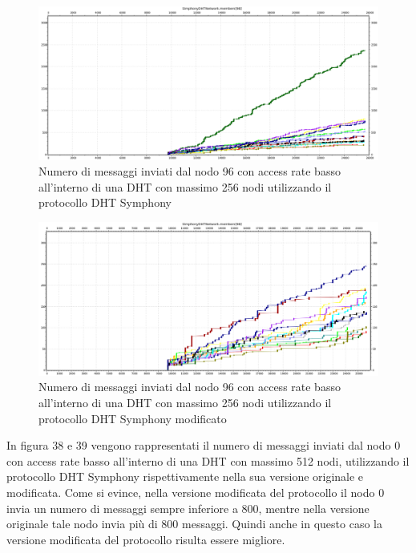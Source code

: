 \documentclass[	
	DIV=calc,
	paper=a4,
	fontsize=11pt,
	onecolumn
]{scrartcl} %
\begin{document}
	\begin{figure}[H]
		\centering
		\includegraphics[scale=0.35]	{SymphonyDHT/plots/MessagesSentByEveryNode/256_Nodes_SlowAccess/SymphonyDHT_256Nodes_SlowAccess_Node96.png}
		\caption{Numero di messaggi inviati dal nodo 96 con access rate basso all'interno di una DHT con massimo 256 nodi utilizzando il protocollo DHT Symphony}
		\label{Figura 36}
	\end{figure}
	\begin{figure}[H]
		\centering
		\includegraphics[scale=0.35]	{SymphonyDHTMod/plots/MessagesSentByEveryNode/256_Nodes_SlowAccess/SymphonyDHTMod_256Nodes_SlowAccess_Node96.png}
		\caption{Numero di messaggi inviati dal nodo 96 con access rate basso all'interno di una DHT con massimo 256 nodi utilizzando il protocollo DHT Symphony modificato}
		\label{Figura 37}
	\end{figure}		
	
	In figura 38 e 39 vengono rappresentati il numero di messaggi inviati dal nodo 0 con access rate basso all'interno di una DHT con massimo 512 nodi, utilizzando il protocollo DHT Symphony rispettivamente nella sua versione originale e modificata. Come si evince, nella versione modificata del protocollo il nodo 0 invia un numero di messaggi sempre inferiore a 800, mentre nella versione originale tale nodo invia più di 800 messaggi. Quindi anche in questo caso la versione modificata del protocollo risulta essere migliore.
	
\end{document}
